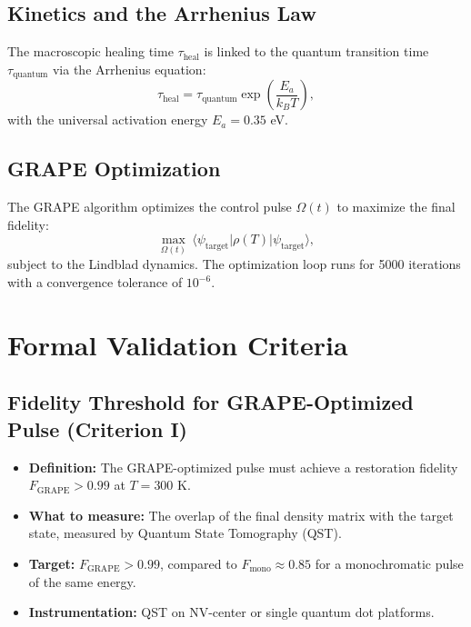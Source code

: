 \documentclass[12pt]{article}
\begin{document}
\subsection{Kinetics and the Arrhenius Law}
The macroscopic healing time $\tau_{\text{heal}}$ is linked to the quantum transition time $\tau_{\text{quantum}}$ via the Arrhenius equation:
\begin{equation}
\tau_{\text{heal}} = \tau_{\text{quantum}} \exp\left(\frac{E_a}{k_B T}\right),
\end{equation}
with the universal activation energy $E_a = 0.35$ eV.

\subsection{GRAPE Optimization}
The GRAPE algorithm optimizes the control pulse $\Omega(t)$ to maximize the final fidelity:
\begin{equation}
\max_{\Omega(t)} \, \langle \psi_{\text{target}} | \rho(T) | \psi_{\text{target}} \rangle,
\end{equation}
subject to the Lindblad dynamics. The optimization loop runs for 5000 iterations with a convergence tolerance of $10^{-6}$.

\section{Formal Validation Criteria}

\subsection{Fidelity Threshold for GRAPE-Optimized Pulse (Criterion I)}
\begin{itemize}
    \item \textbf{Definition:} The GRAPE-optimized pulse must achieve a restoration fidelity $F_{\text{GRAPE}} > 0.99$ at $T=300$ K.
    \item \textbf{What to measure:} The overlap of the final density matrix with the target state, measured by Quantum State Tomography (QST).
    \item \textbf{Target:} $F_{\text{GRAPE}} > 0.99$, compared to $F_{\text{mono}} \approx 0.85$ for a monochromatic pulse of the same energy.
    \item \textbf{Instrumentation:} QST on NV-center or single quantum dot platforms.
\end{itemize}
\end{document}
